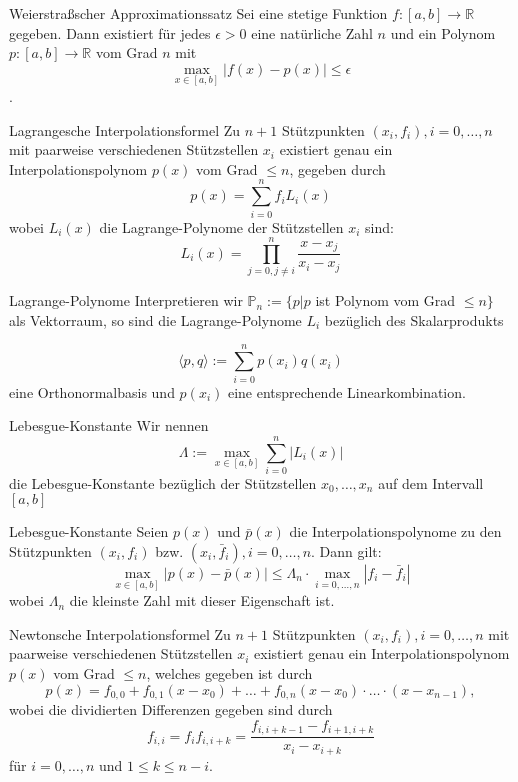 \begin{flashcard}[Definition]{Weierstraßscher Approximationssatz}
Sei eine stetige Funktion $f: [a, b] \rightarrow \mathbb{R}$ gegeben.
Dann existiert für jedes $\epsilon > 0$ eine natürliche Zahl $n$ und ein Polynom
$p : [a, b] \rightarrow \mathbb{R}$ vom Grad $n$ mit
$$
	\max\limits_{x \in [a,b]} |f(x) - p(x)| \leq \epsilon
$$.
\end{flashcard}

\begin{flashcard}[Definition]{Lagrangesche Interpolationsformel}
Zu $n+1$ Stützpunkten $(x_i,f_i), i=0,\ldots,n$
mit paarweise verschiedenen Stützstellen $x_i$ existiert
genau ein Interpolationspolynom $p(x)$ vom Grad $\leq n$,  gegeben durch
$$
	p(x) = \sum_{i=0}^{n} f_i L_i(x)
$$
wobei $L_i(x)$ die Lagrange-Polynome der Stützstellen $x_i$ sind:
$$
	L_i(x) = \prod_{j=0, j \neq i}^{n} \frac{x-x_j}{x_i-x_j}
$$
\end{flashcard}

\begin{flashcard}[Bemerkung]{Lagrange-Polynome}
Interpretieren wir $\mathbb{P}_n := \lbrace p | p$ ist Polynom vom Grad $\leq n \rbrace$
als Vektorraum, so sind die Lagrange-Polynome $L_i$ bezüglich des Skalarprodukts

$$
	\langle p, q \rangle := \sum_{i=0}^{n} p(x_i) q(x_i)
$$
eine Orthonormalbasis und $p(x_i)$ eine entsprechende Linearkombination.
\end{flashcard}

\begin{flashcard}[Definition]{Lebesgue-Konstante}
Wir nennen
$$
	\Lambda := \max\limits_{x \in [a,b]} \sum_{i=0}^{n} |L_i(x)|
$$
die Lebesgue-Konstante bezüglich der Stützstellen $x_0,\ldots,x_n$ auf dem Intervall $[a,b]$
\end{flashcard}

\begin{flashcard}[Satz]{Lebesgue-Konstante}
Seien $p(x)$ und $\bar{p}(x)$ die Interpolationspolynome zu den Stützpunkten $(x_i, f_i)$
bzw. $(x_i, \bar{f}_i), i=0,\ldots,n$. Dann gilt:
$$
	\max\limits_{x \in [a,b]} |p(x) - \bar{p}(x)| \leq \Lambda_n \cdot \max\limits_{i=0,\ldots,n} |f_i - \bar{f}_i|
$$
wobei $\Lambda_n$ die kleinste Zahl mit dieser Eigenschaft ist.
\end{flashcard}

\begin{flashcard}[Satz]{Newtonsche Interpolationsformel}
Zu $n+1$ Stützpunkten $(x_i, f_i), i=0, \ldots , n$ mit paarweise verschiedenen Stützstellen $x_i$
existiert genau ein Interpolationspolynom $p(x)$ vom Grad $\leq n$, welches gegeben ist durch
$$
	p(x) = f_{0,0} + f_{0,1}(x-x_0) + \ldots + f_{0,n}(x-x_0) \cdot \ldots \cdot (x-x_{n-1}),
$$
wobei die dividierten Differenzen gegeben sind durch
$$
	f_{i,i} = f_i
	f_{i,i+k} = \frac{f_{i,i+k-1}-f_{i+1,i+k}}{x_i-x_{i+k}}
$$
für $i=0, \ldots , n$ und $1 \leq k \leq n-i$.
\end{flashcard}

